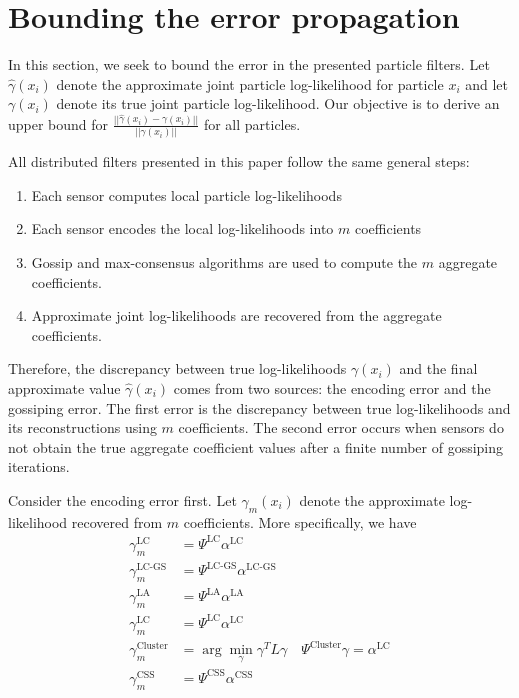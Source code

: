 \documentclass[10pt,letterpaper,final]{article}
\begin{document}
\section{Bounding the error propagation}
In this section, we seek to bound the error in the presented particle filters. Let $\hat{\gamma}(x_i)$ denote the approximate joint particle log-likelihood for particle $x_i$ and let $\gamma(x_i)$ denote its true joint particle log-likelihood. Our objective is to derive an upper bound for $\frac{||\hat{\gamma}(x_i)-\gamma(x_i)||}{||\gamma(x_i)||}$ for all particles.

All distributed filters presented in this paper follow the same general steps:
\begin{enumerate}
\item Each sensor computes local particle log-likelihoods
\item Each sensor encodes the local log-likelihoods into $m$ coefficients
\item Gossip and max-consensus algorithms are used to compute the $m$ aggregate coefficients. 
\item Approximate joint log-likelihoods are recovered from the aggregate coefficients. 
\end{enumerate}

Therefore, the discrepancy between true log-likelihoods $\gamma(x_i)$ and the final approximate value $\hat{\gamma}(x_i)$ comes from two sources: the encoding error and the gossiping error. The first error is the discrepancy between true log-likelihoods and its reconstructions using $m$ coefficients. The second error occurs when sensors do not obtain the true aggregate coefficient values after a finite number of gossiping iterations. 

Consider the encoding error first. Let $\gamma_m(x_i)$ denote the approximate log-likelihood recovered from $m$ coefficients. More specifically, we have
\begin{align}
\gamma_m^{\text{LC}} &= \Psi^{\text{LC}}\alpha^{\text{LC}} \\
\gamma_m^{\text{LC-GS}} &= \Psi^{\text{LC-GS}}\alpha^{\text{LC-GS}} \\
\gamma_m^{\text{LA}} &= \Psi^{\text{LA}}\alpha^{\text{LA}} \\
\gamma_m^{\text{LC}} &= \Psi^{\text{LC}}\alpha^{\text{LC}} \\
\gamma_m^{\text{Cluster}} &= \arg \min_{\gamma} \gamma^T L \gamma \quad \Psi^{\text{Cluster}}\gamma = \alpha^{\text{LC}} \\
\gamma_m^{\text{CSS}} &= \Psi^{\text{CSS}}\alpha^{\text{CSS}}
\end{align}
\end{document}
